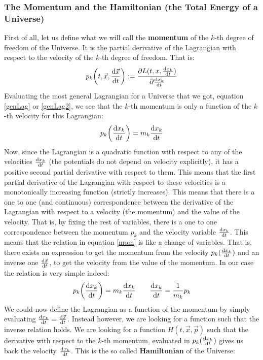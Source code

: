 \documentclass[11pt, a4paper]{article} %
\begin{document}
\subsubsection*{The Momentum and the Hamiltonian (the Total Energy of a Universe)}
First of all, let us define what we will call the {\bf momentum} of the $k$-th degree of freedom of the Universe. It is the partial derivative of the Lagrangian with respect to the velocity of the $k$-th degree of freedom. That is:
\begin{equation}
p_k\qty(t,\vec{x},\dv{\vec{x}}{t}):=\pdv{L(t,x,\dv{x_k}{t})}{\dv{x_k}{t}}
\end{equation}
Evaluating the most general Lagrangian for a Universe that we got, equation \eqref{genLag} or \eqref{genLag2}, we see that the $k$-th momentum is only a function of the $k$-th velocity for this Lagrangian:
\begin{equation}\label{mom}
p_k\qty(\dv{x_k}{t})=m_k\dv{x_k}{t}
\end{equation}
Now, since the Lagrangian is a quadratic function with respect to any of the velocities $\dv{x_k}{t}$ (the potentials do not depend on velocity explicitly), it has a positive second partial derivative with respect to them. This means that the first partial derivative of the Lagrangian with respect to these velocities is a monotonically increasing function (strictly increases). This means that there is a one to one (and continuous) correspondence between the derivative of the Lagrangian with respect to a velocity (the momentum) and the value of the velocity. That is, by fixing the rest of variables, there is a one to one correspondence between the momentum $p_k$ and the velocity variable $\dv{x_k}{t}$. This means that the relation in equation \eqref{mom} is like a change of variables. That is, there exists an expression to get the momentum from the velocity $p_k(\dv{x_k}{t})$ and an inverse one $\dv{\vec{x}}{t} (p_k)$, to get the velocity from  the value of the momentum. In our case the relation is very simple indeed:
\begin{equation}
p_k\qty(\dv{x_k}{t})=m_k\dv{x_k}{t}\quad \quad \dv{x_k}{t} (p_k)=\frac{1}{m_k}p_k
\end{equation}
We could now define the Lagrangian as a function of the momentum by simply evaluating $\dv{x_k}{t}=\dv{\vec{x}}{t} (p_k)$. Instead however, we are looking for a function such that the inverse relation holds. We are looking for a function $H(t, \vec{x}, \vec{p})$ such that the derivative with respect to the $k$-th momentum, evaluated in $p_k(\dv{x_k}{t})$ gives us back the velocity $\dv{x_k}{t}$. This is the so called {\bf Hamiltonian} of the Universe:
\end{document}
